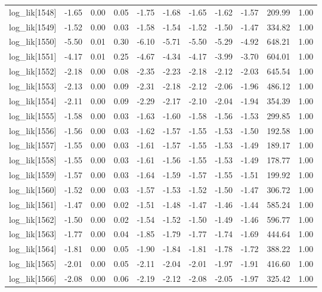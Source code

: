 \begin{table}[ht]
\begin{tabular}{rrrrrrrrrrr}
  log\_lik[1548] & -1.65 & 0.00 & 0.05 & -1.75 & -1.68 & -1.65 & -1.62 & -1.57 & 209.99 & 1.00 \\ 
  log\_lik[1549] & -1.52 & 0.00 & 0.03 & -1.58 & -1.54 & -1.52 & -1.50 & -1.47 & 334.82 & 1.00 \\ 
  log\_lik[1550] & -5.50 & 0.01 & 0.30 & -6.10 & -5.71 & -5.50 & -5.29 & -4.92 & 648.21 & 1.00 \\ 
  log\_lik[1551] & -4.17 & 0.01 & 0.25 & -4.67 & -4.34 & -4.17 & -3.99 & -3.70 & 604.01 & 1.00 \\ 
  log\_lik[1552] & -2.18 & 0.00 & 0.08 & -2.35 & -2.23 & -2.18 & -2.12 & -2.03 & 645.54 & 1.00 \\ 
  log\_lik[1553] & -2.13 & 0.00 & 0.09 & -2.31 & -2.18 & -2.12 & -2.06 & -1.96 & 486.12 & 1.00 \\ 
  log\_lik[1554] & -2.11 & 0.00 & 0.09 & -2.29 & -2.17 & -2.10 & -2.04 & -1.94 & 354.39 & 1.00 \\ 
  log\_lik[1555] & -1.58 & 0.00 & 0.03 & -1.63 & -1.60 & -1.58 & -1.56 & -1.53 & 299.85 & 1.00 \\ 
  log\_lik[1556] & -1.56 & 0.00 & 0.03 & -1.62 & -1.57 & -1.55 & -1.53 & -1.50 & 192.58 & 1.00 \\ 
  log\_lik[1557] & -1.55 & 0.00 & 0.03 & -1.61 & -1.57 & -1.55 & -1.53 & -1.49 & 189.17 & 1.00 \\ 
  log\_lik[1558] & -1.55 & 0.00 & 0.03 & -1.61 & -1.56 & -1.55 & -1.53 & -1.49 & 178.77 & 1.00 \\ 
  log\_lik[1559] & -1.57 & 0.00 & 0.03 & -1.64 & -1.59 & -1.57 & -1.55 & -1.51 & 199.92 & 1.00 \\ 
  log\_lik[1560] & -1.52 & 0.00 & 0.03 & -1.57 & -1.53 & -1.52 & -1.50 & -1.47 & 306.72 & 1.00 \\ 
  log\_lik[1561] & -1.47 & 0.00 & 0.02 & -1.51 & -1.48 & -1.47 & -1.46 & -1.44 & 585.24 & 1.00 \\ 
  log\_lik[1562] & -1.50 & 0.00 & 0.02 & -1.54 & -1.52 & -1.50 & -1.49 & -1.46 & 596.77 & 1.00 \\ 
  log\_lik[1563] & -1.77 & 0.00 & 0.04 & -1.85 & -1.79 & -1.77 & -1.74 & -1.69 & 444.64 & 1.00 \\ 
  log\_lik[1564] & -1.81 & 0.00 & 0.05 & -1.90 & -1.84 & -1.81 & -1.78 & -1.72 & 388.22 & 1.00 \\ 
  log\_lik[1565] & -2.01 & 0.00 & 0.05 & -2.11 & -2.04 & -2.01 & -1.97 & -1.91 & 416.60 & 1.00 \\ 
  log\_lik[1566] & -2.08 & 0.00 & 0.06 & -2.19 & -2.12 & -2.08 & -2.05 & -1.97 & 325.42 & 1.00 \\ 

\end{tabular}
\end{table}
